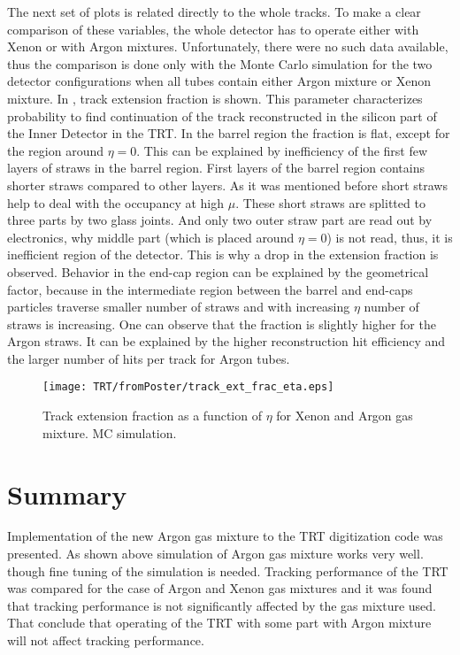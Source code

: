 The next set of plots is related directly to the whole tracks. To make a clear comparison of these variables, the whole detector has to operate either with Xenon or with Argon mixtures.
Unfortunately, there were no such data available, thus the comparison is done only with the Monte Carlo simulation for the two detector configurations when 
all tubes contain either Argon mixture or Xenon mixture. In , track extension fraction is shown. This parameter characterizes
probability to find continuation of the track reconstructed in the silicon part of the Inner Detector in the TRT.
In the barrel region the fraction is flat, except for the region around $\eta = 0$. This can be explained by inefficiency of the first few layers of straws in the barrel region.
First layers of the barrel region contains shorter straws compared to other layers. 
As it was mentioned before short straws help to deal with the occupancy at high $\mu$.
These short straws are splitted to three parts by two glass joints. And only two outer 
straw part are read out by electronics, why middle part (which is placed around $\eta=0$) is not read, thus, it is inefficient region of the detector. 
This is why a drop in the extension fraction is observed.
Behavior in the end-cap region can be explained by the geometrical factor, because in the intermediate region between the barrel and end-caps particles
traverse smaller number of straws and with increasing $\eta$ number of straws is increasing.
One can observe that the fraction is slightly higher for the Argon straws. It can be explained by the higher reconstruction hit efficiency and the larger number of hits per
track for Argon tubes.

\begin{figure}
\begin{center}
 \texttt{[image: TRT/fromPoster/track\_ext\_frac\_eta.eps]}
\caption{Track extension fraction as a function of $\eta$ for Xenon and Argon gas mixture. MC simulation.}
\label{fig:track_ext_fraction}
\end{center}
\end{figure}

\section{Summary}
\label{sec:trt_summary}

Implementation of the new Argon gas mixture to the TRT digitization code was presented. As shown above simulation of Argon gas mixture works very well. though 
fine tuning of the simulation is needed.
Tracking performance of the TRT was compared for the case of Argon and Xenon gas mixtures and it was found that tracking performance is not significantly affected
by the gas mixture used. That conclude that operating of the TRT with some part with Argon mixture will not affect tracking performance.



